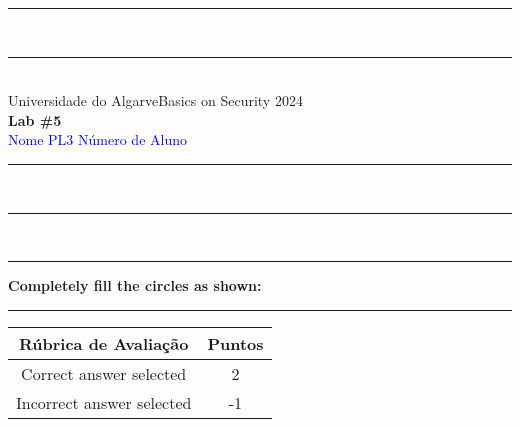 \documentclass{article} %
\begin{document}
\begin{center}
\rule{\textwidth}{.0075in} \\
\rule[3mm]{\textwidth}{.0075in}\\

Universidade do Algarve\hfill Basics on Security \hfill 2024\\[3ex]

{\Large\bf Lab \#5} \\[3ex]

 \textcolor{blue}{Nome} \hfill  
 \textcolor{blue}{PL3} \hfill
 \textcolor{blue}{Número de Aluno}\\

\rule{\textwidth}{.0075in} \\
\rule[3mm]{\textwidth}{.0075in} \\
\end{center}


\begin{center}
\rule{\textwidth}{0.4pt}
\textbf{Completely fill the circles as shown: \Circle \Circle \CIRCLE \Circle}
\rule{\textwidth}{0.4pt}
\end{center}


\bigskip
\bigskip

{\Large
\begin{tabular}{|c|c|} \hline
\textbf{Rúbrica de Avaliação}  & \textbf{Puntos}\\ \hline
Correct answer selected & 2\\  \hline
Incorrect answer selected & -1\\  \hline
\end{tabular}
}

\bigskip
\bigskip
\end{document}
